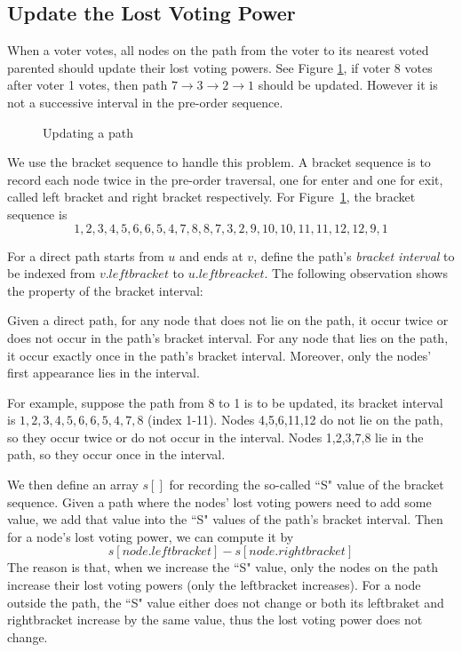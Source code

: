 \subsection{Update the Lost Voting Power}
When a voter votes, all nodes on the path from the voter to its nearest voted parented should update their lost voting powers. See Figure \ref{fig:2}, if voter 8 votes after voter 1 votes, then path $7\rightarrow3\rightarrow2\rightarrow1$ should be updated. However it is not a successive interval in the pre-order sequence.
\begin{figure}
  \centering
  
	\caption{Updating a path}
	\label{fig:2}
\end{figure}

We use the bracket sequence to handle this problem. A bracket sequence is to
record each node twice in the pre-order traversal, one for enter and one for
exit, called left bracket and right bracket respectively. For Figure~\ref{fig:2}, the bracket sequence is
$$1,2,3,4,5,6,6,5,4,7,8,8,7,3,2,9,10,10,11,11,12,12,9,1$$

For a direct path starts from $u$ and ends at $v$, define the path's {\em bracket interval} to be indexed from $v.leftbracket$ to $u.leftbreacket$. The following observation shows the property of the bracket interval:
\begin{observation}
Given a direct path, for any node that does not lie on the path, it occur twice or does not occur in the path's bracket interval. For any node that lies on the path, it occur exactly once in the path's bracket interval. Moreover, only the nodes' first appearance lies in the interval.
\end{observation}
For example, suppose the path from 8 to 1 is to be updated, its bracket interval is $1,2,3,4,5,6,6,5,4,7,8$ (index 1-11). Nodes 4,5,6,11,12 do not lie on the path, so they occur twice or do not occur in the interval. Nodes 1,2,3,7,8 lie in the path, so they occur once in the interval. 

We then define an array $s[]$ for recording the so-called ``S" value of the bracket sequence. Given a path where the nodes' lost voting powers need to add some value, we add that value into the ``S" values of the path's bracket interval. Then for a node's  lost voting power, we can compute it by
 $$s[node.leftbracket]-s[node.rightbracket]$$
 The reason is that, when we increase the ``S" value, only the nodes on the path increase their lost voting powers (only the leftbracket increases). For a node outside the path, the ``S" value either does not change or both its leftbraket and rightbracket increase by the same value, thus the lost voting power does not change.

